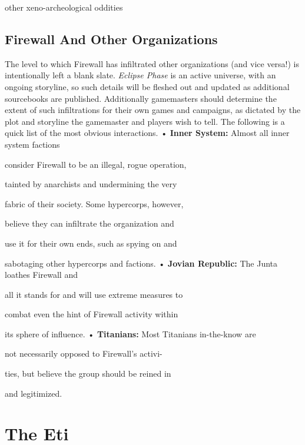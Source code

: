 other xeno-archeological oddities 

\subsection{Firewall And Other Organizations }

The level to which Firewall has infiltrated other organizations
(and vice versa!) is intentionally left a blank
slate. \textit{Eclipse Phase }is an active universe, with an ongoing
storyline, so such details will be fleshed out and
updated as additional sourcebooks are published. Additionally
gamemasters should determine the extent of
such infiltrations for their own games and campaigns, 
as dictated by the plot and storyline the gamemaster 
and players wish to tell. 
The following is a quick list of the most obvious 
interactions. 
•  \textbf{Inner System:} Almost all inner system factions 

consider Firewall to be an illegal, rogue operation, 

tainted by anarchists and undermining the very 

fabric of their society. Some hypercorps, however, 

believe they can infiltrate the organization and 

use it for their own ends, such as spying on and 

sabotaging other hypercorps and factions. 
•  \textbf{Jovian Republic:} The Junta loathes Firewall and 

all it stands for and will use extreme measures to 

combat even the hint of Firewall activity within 

its sphere of influence.
•  \textbf{Titanians:} Most Titanians in-the-know are 

not necessarily opposed to Firewall's activi-

ties, but believe the group should be reined in 

and legitimized. 

\section{The Eti }

